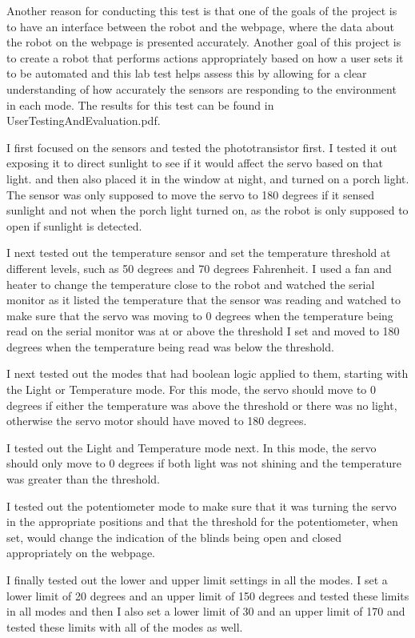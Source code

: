 \documentclass[10pt,twocolumn]{article}
\begin{document}
Another reason for conducting this test is that one of the goals of the project is to have an interface between the robot and the webpage, where the data about the robot on the webpage is presented accurately. Another goal of this project is to create a robot that performs actions appropriately based on how a user sets it to be automated and this lab test helps assess this by allowing for a clear understanding of how accurately the sensors are responding to the environment in each mode. The results for this test can be found in UserTestingAndEvaluation.pdf.

I first focused on the sensors and tested the phototransistor first. I tested it out exposing it to direct sunlight to see if it would affect the servo based on that light.  and then also placed it in the window at night, and turned on a porch light. The sensor was only supposed to move the servo to 180 degrees if it sensed sunlight and not when the porch light turned on, as the robot is only supposed to open if sunlight is detected.

I next tested out the temperature sensor and set the temperature threshold at different levels, such as 50 degrees and 70 degrees Fahrenheit. I used a fan and heater to change the temperature close to the robot and watched the serial monitor as it listed the temperature that the sensor was reading and watched to make sure that the servo was moving to 0 degrees when the temperature being read on the serial monitor was at or above the threshold I set and moved to 180 degrees when the temperature being read was below the threshold.

I next tested out the modes that had boolean logic applied to them, starting with the Light or Temperature mode. For this mode, the servo should move to 0 degrees if either the temperature was above the threshold or there was no light, otherwise the servo motor should have moved to 180 degrees.

I tested out the Light and Temperature mode next. In this mode, the servo should only move to 0 degrees if both light was not shining and the temperature was greater than the threshold.

I tested out the potentiometer mode to make sure that it was turning the servo in the appropriate positions and that the threshold for the potentiometer, when set, would change the indication of the blinds being open and closed appropriately on the webpage.

I finally tested out the lower and upper limit settings in all the modes. I set a lower limit of 20 degrees and an upper limit of 150 degrees and tested these limits in all modes and then I also set a lower limit of 30 and an upper limit of 170 and tested these limits with all of the modes as well.
\end{document}
